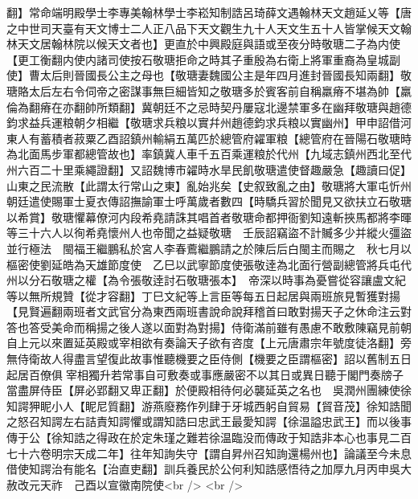 翻】常命端明殿學士李專美翰林學士李崧知制誥呂琦薛文遇翰林天文趙延乂等【唐之中世司天臺有天文博士二人正八品下天文觀生九十人天文生五十人皆掌候天文翰林天文居翰林院以候天文者也】更直於中興殿庭與語或至夜分時敬瑭二子為内使【更工衡翻内使内諸司使按石敬瑭拒命之時其子重殷為右衛上將軍重裔為皇城副使】曹太后則晉國長公主之母也【敬瑭妻魏國公主是年四月進封晉國長知兩翻】敬瑭賂太后左右令伺帝之密謀事無巨細皆知之敬瑭多於賓客前自稱羸瘠不堪為帥【羸倫為翻瘠在亦翻帥所類翻】冀朝廷不之忌時契丹屢寇北邊禁軍多在幽拜敬瑭與趙德鈞求益兵運粮朝夕相繼【敬瑭求兵粮以實幷州趙德鈞求兵粮以實幽州】甲申詔借河東人有蓄積者菽粟乙酉詔鎮州輸絹五萬匹於總管府糴軍粮【總管府在晉陽石敬瑭時為北面馬步軍都總管故也】率鎮冀人車千五百乘運粮於代州【九域志鎮州西北至代州六百二十里乘繩證翻】又詔魏博市糴時水旱民飢敬瑭遣使督趣嚴急【趣讀曰促】山東之民流散【此謂太行常山之東】亂始兆矣【史叙致亂之由】敬瑭將大軍屯忻州朝廷遣使賜軍士夏衣傳詔撫諭軍士呼萬歲者數四【時驕兵習於聞見又欲扶立石敬瑭以希賞】敬瑭懼幕僚河内段希堯請誅其唱首者敬瑭命都押衙劉知遠斬挾馬都將李暉等三十六人以徇希堯懷州人也帝聞之益疑敬瑭　壬辰詔竊盜不計贓多少并縱火彊盜並行極法　閩福王繼鵬私於宮人李春鷰繼鵬請之於陳后后白閩主而賜之　秋七月以樞密使劉延皓為天雄節度使　乙巳以武寧節度使張敬逹為北面行營副總管將兵屯代州以分石敬瑭之權【為令張敬逹討石敬瑭張本】　帝深以時事為憂嘗從容讓盧文紀等以無所規贊【從才容翻】丁巳文紀等上言臣等每五日起居與兩班旅見暫獲對揚【見賢遍翻兩班者文武官分為東西兩班書說命說拜稽首曰敢對揚天子之休命注云對答也答受美命而稱揚之後人遂以面對為對揚】侍衛滿前雖有愚慮不敢敷陳竊見前朝自上元以來置延英殿或宰相欲有奏論天子欲有咨度【上元唐肅宗年號度徒洛翻】旁無侍衛故人得盡言望復此故事惟聽機要之臣侍側【機要之臣謂樞密】詔以舊制五日起居百僚俱宰相獨升若常事自可敷奏或事應嚴密不以其日或異日聽于閣門奏牓子當盡屏侍臣【屏必郢翻又卑正翻】於便殿相待何必襲延英之名也　吳潤州團練使徐知諤狎眤小人【眤尼質翻】游燕廢務作列肆于牙城西躬自貿易【貿音茂】徐知誥聞之怒召知諤左右詰責知諤懼或謂知誥曰忠武王最愛知諤【徐温謚忠武王】而以後事傳于公【徐知誥之得政在於定朱瑾之難若徐温臨没而傳政于知誥非本心也事見二百七十六卷明宗天成二年】往年知詢失守【謂自昇州召知詢還楊州也】論議至今未息借使知諤治有能名【治直吏翻】訓兵養民於公何利知誥感悟待之加厚九月丙申吳大赦改元天祚　己酉以宣徽南院使<br />
<br />
